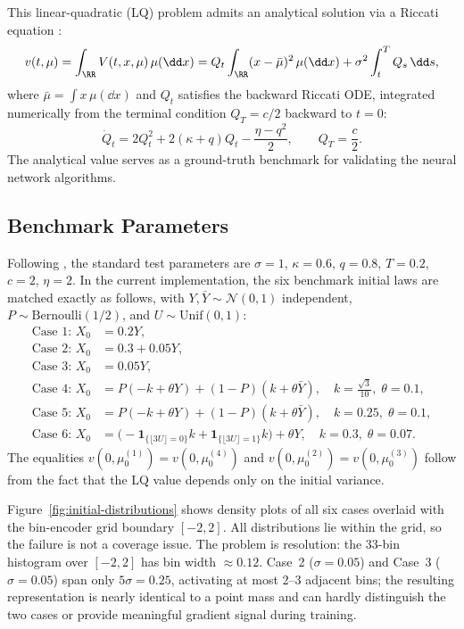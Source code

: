 \documentclass[11pt]{article}
\begin{document}
This linear-quadratic (LQ) problem admits an analytical solution via a Riccati equation \citep{carmona2018mfg1}:
\begin{equation}\label{eq:systemic-value}
  v(t, \mu) = \int_{\RR} V(t, x, \mu)\,\mu(\dd x) = Q_t \int_{\RR} (x - \bar{\mu})^2\,\mu(\dd x) + \sigma^2 \int_t^T Q_s\,\dd s,
\end{equation}
where $\bar{\mu} = \int x\,\mu(\dd x)$ and $Q_t$ satisfies the backward Riccati ODE, integrated numerically from the terminal condition $Q_T = c/2$ backward to $t = 0$:
\begin{equation}\label{eq:riccati-ode}
  \dot{Q}_t = 2Q_t^2 + 2(\kappa + q)Q_t - \frac{\eta - q^2}{2}, \qquad Q_T = \frac{c}{2}.
\end{equation} The analytical value serves as a ground-truth benchmark for validating the neural network algorithms.

\subsection{Benchmark Parameters}

Following \citet{pham2024mfnn}, the standard test parameters are $\sigma = 1$, $\kappa = 0.6$, $q = 0.8$, $T = 0.2$, $c = 2$, $\eta = 2$. In the current implementation, the six benchmark initial laws are matched exactly as follows, with $Y, \bar Y \sim \mathcal{N}(0,1)$ independent, $P \sim \mathrm{Bernoulli}(1/2)$, and $U \sim \mathrm{Unif}(0,1)$:
\begin{align*}
  \text{Case 1: } X_0 &= 0.2Y, \\
  \text{Case 2: } X_0 &= 0.3 + 0.05Y, \\
  \text{Case 3: } X_0 &= 0.05Y, \\
  \text{Case 4: } X_0 &= P(-k + \theta Y) + (1-P)(k + \theta \bar Y), \quad k = \frac{\sqrt{3}}{10}, \; \theta = 0.1, \\
  \text{Case 5: } X_0 &= P(-k + \theta Y) + (1-P)(k + \theta \bar Y), \quad k = 0.25, \; \theta = 0.1, \\
  \text{Case 6: } X_0 &= \big(-\mathbf{1}_{\{\lfloor 3U \rfloor = 0\}}k + \mathbf{1}_{\{\lfloor 3U \rfloor = 1\}}k\big) + \theta Y, \quad k = 0.3, \; \theta = 0.07.
\end{align*}
The equalities $v(0,\mu_0^{(1)}) = v(0,\mu_0^{(4)})$ and $v(0,\mu_0^{(2)}) = v(0,\mu_0^{(3)})$ follow from the fact that the LQ value depends only on the initial variance.

Figure~\ref{fig:initial-distributions} shows density plots of all six cases overlaid with the bin-encoder grid boundary $[-2,2]$. All distributions lie within the grid, so the failure is not a coverage issue. The problem is resolution: the 33-bin histogram over $[-2,2]$ has bin width $\approx 0.12$. Case~2 ($\sigma=0.05$) and Case~3 ($\sigma=0.05$) span only $5\sigma = 0.25$, activating at most 2--3 adjacent bins; the resulting representation is nearly identical to a point mass and can hardly distinguish the two cases or provide meaningful gradient signal during training.
\end{document}
